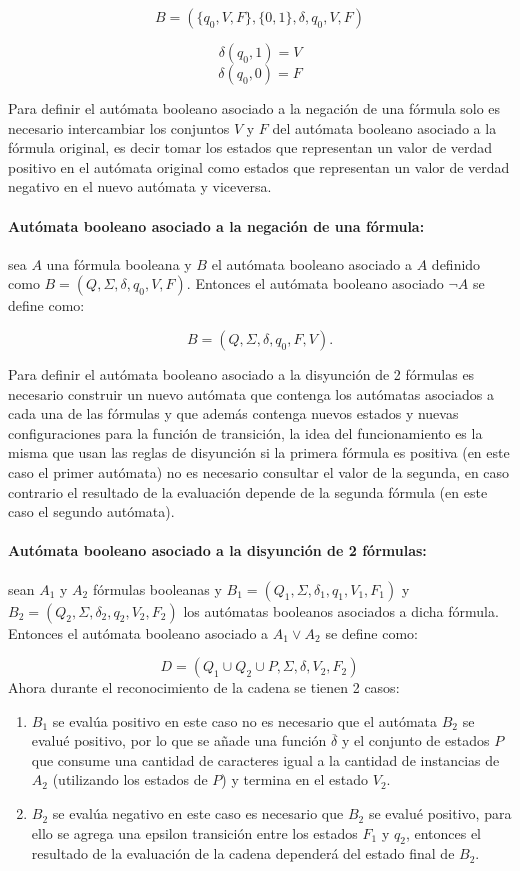 \documentclass[12pt]{article}
\begin{document}
$$B=(\{q_0,V,F\},\{0,1\},\delta,q_0,V,F)$$

$$\delta(q_0,1)=V$$
$$\delta(q_0,0)=F$$

Para definir el autómata booleano asociado a la negación de una fórmula solo es necesario intercambiar los conjuntos $V$ y $F$ del
autómata booleano asociado a la fórmula original, es decir tomar los estados que representan un valor de verdad positivo en el autómata
original como estados que representan un valor de verdad negativo en el nuevo autómata y viceversa.  

\paragraph{Autómata booleano asociado a la negación de una fórmula:} sea $A$ una fórmula booleana y $B$ el autómata booleano asociado a $A$ definido
como $B=(Q,\Sigma,\delta,q_0,V,F)$. Entonces el autómata booleano asociado $\neg A$ se define como:

$$B=(Q,\Sigma,\delta,q_0,F,V).$$

Para definir el autómata booleano asociado a la disyunción de 2 fórmulas es necesario construir un nuevo autómata que contenga los
autómatas asociados a cada una de las fórmulas y que además contenga nuevos estados y nuevas configuraciones para la función de transición,
la idea del funcionamiento es la misma que usan las reglas de disyunción si la primera fórmula es positiva (en este caso el primer autómata)
no es necesario consultar el valor de la segunda, en caso contrario el resultado de la evaluación depende de la segunda fórmula
(en este caso el segundo autómata).


\paragraph{Autómata booleano asociado a la disyunción de 2 fórmulas:} sean $A_1$ y $A_2$ fórmulas booleanas y
$B_1=(Q_1,\Sigma,\delta_1,q_1,V_1,F_1)$ y $B_2=(Q_2,\Sigma,\delta_2,q_2,V_2,F_2)$ los autómatas booleanos asociados a dicha fórmula. Entonces el autómata booleano asociado a
$A_1 \vee A_2$ se define como:

$$
      D=(Q_1\cup Q_2 \cup P,\Sigma,\delta,V_2, F_2)
$$
Ahora durante el reconocimiento de la cadena se tienen 2 casos:

\begin{enumerate}
      \item $B_1$ se evalúa positivo en este caso no es necesario que el autómata $B_2$ se evalué positivo, por lo
            que se añade una función $\overline{\delta}$ y el conjunto de estados $P$
            que consume una cantidad de caracteres igual a la cantidad de instancias de $A_2$ (utilizando los estados
            de $P$) y termina en el estado $V_2$.
      \item $B_2$ se evalúa negativo en este caso es necesario que $B_2$ se evalué positivo, para ello se agrega una epsilon
            transición entre los estados $F_1$ y $q_2$, entonces el resultado de la evaluación de la cadena dependerá
            del estado final de $B_2$.
\end{enumerate}
\end{document}
